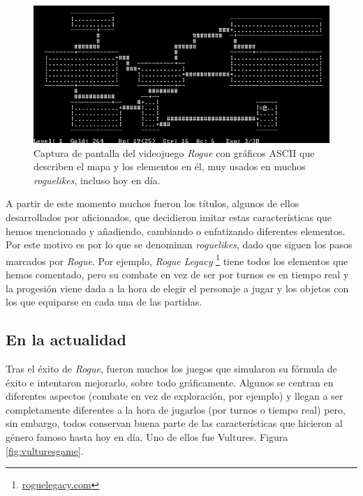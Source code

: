 \begin{figure}[h!]
		\includegraphics[width=\textwidth,height=\textheight,keepaspectratio]{./img/roguegame.PNG}
	\caption{Captura de pantalla del videojuego \textit{Rogue} con gráficos ASCII que describen el mapa y los elementos en él, muy usados en muchos \textit{roguelikes}, incluso hoy en día.}
	\label{fig:roguegame}
\end{figure}

A partir de este momento muchos fueron los títulos, algunos de ellos desarrollados por aficionados, que decidieron imitar estas características que hemos mencionado y añadiendo, cambiando o enfatizando diferentes elementos. Por este motivo es por lo que se denominan \textit{roguelikes}, dado que siguen los pasos marcados por \textit{Rogue}.
Por ejemplo, \textit{Rogue Legacy} \footnote{\url{roguelegacy.com}} tiene todos los elementos que hemos comentado, pero su combate en vez de ser por turnos es en tiempo real y la progesión viene dada a la hora de elegir el personaje a jugar y los objetos con los que equiparse en cada una de las partidas.

\subsection{En la actualidad}

Tras el éxito de \textit{Rogue}, fueron muchos los juegos que simularon su fórmula de éxito e intentaron mejorarlo, sobre todo gráficamente. Algunos se centran en diferentes aspectos (combate en vez de exploración, por ejemplo) y llegan a ser completamente diferentes a la hora de jugarlos (por turnos o tiempo real) pero, sin embargo, todos conservan buena parte de las características que hicieron al género famoso hasta hoy en día. Uno de ellos fue Vultures. Figura \ref{fig:vulturesgame}. 

